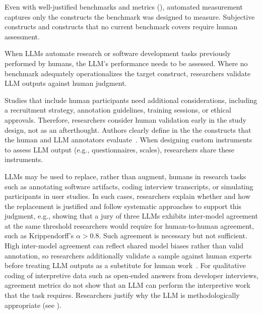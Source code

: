 
Even with well-justified benchmarks and metrics (\benchmarksmetrics), automated measurement captures only the constructs the benchmark was designed to measure.
Subjective constructs and constructs that no current benchmark covers require human assessment.


When LLMs automate research or software development tasks previously performed by humans, the LLM's performance needs to be assessed.
Where no benchmark adequately operationalizes the target construct, researchers \should validate LLM outputs against human judgment.

Studies that include human participants need additional considerations, including a recruitment strategy, annotation guidelines, training sessions, or ethical approvals.
Therefore, researchers \should consider human validation early in the study design, not as an afterthought.
Authors \must clearly define in the \paper the constructs that the human and LLM annotators evaluate~\cite{DBLP:conf/ease/RalphT18}.
When designing custom instruments to assess LLM output (e.g., questionnaires, scales), researchers \must share these instruments.

LLMs may be used to replace, rather than augment, humans in research tasks such as annotating software artifacts, coding interview transcripts, or simulating participants in user studies. In such cases, researchers \must explain whether and how the replacement is justified and \should follow systematic approaches to support this judgment, e.g., showing that a jury of three LLMs exhibits inter-model agreement at the same threshold researchers would require for human-to-human agreement, such as Krippendorff's $\alpha>0.8$. Such agreement is necessary but not sufficient. High inter-model agreement can reflect shared model biases rather than valid annotation, so researchers \should additionally validate a sample against human experts before treating LLM outputs as a substitute for human work~\cite{DBLP:conf/msr/AhmedDTP25, Krippendorff2018}. For qualitative coding of interpretive data such as open-ended answers from developer interviews, agreement metrics do not show that an LLM can perform the interpretive work that the task requires. Researchers \should justify why the LLM is methodologically appropriate (see \llmsforresearcher).

